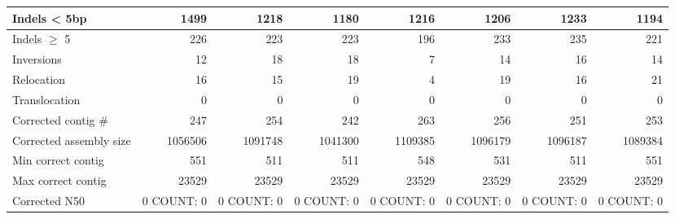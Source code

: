 \documentclass[12pt,a4paper]{article}
\begin{document}
\begin{table}[ht]
\begin{center}
\begin{tabular}{|l*{7}{|r}|}
Indels < 5bp & 1499 & 1218 & 1180 & 1216 & 1206 & 1233 & 1194 \\ \hline
Indels $\geq$ 5 & 226 & 223 & 223 & 196 & 233 & 235 & 221 \\ \hline
Inversions & 12 & 18 & 18 & 7 & 14 & 16 & 14 \\ \hline
Relocation & 16 & 15 & 19 & 4 & 19 & 16 & 21 \\ \hline
Translocation & 0 & 0 & 0 & 0 & 0 & 0 & 0 \\ \hline
Corrected contig \# & 247 & 254 & 242 & 263 & 256 & 251 & 253 \\ \hline
Corrected assembly size & 1056506 & 1091748 & 1041300 & 1109385 & 1096179 & 1096187 & 1089384 \\ \hline
Min correct contig & 551 & 511 & 511 & 548 & 531 & 511 & 551 \\ \hline
Max correct contig & 23529 & 23529 & 23529 & 23529 & 23529 & 23529 & 23529 \\ \hline
Corrected N50 & 0 COUNT: 0 & 0 COUNT: 0 & 0 COUNT: 0 & 0 COUNT: 0 & 0 COUNT: 0 & 0 COUNT: 0 & 0 COUNT: 0 \\ \hline
\end{tabular}
\end{center}
\end{table}
\end{document}
